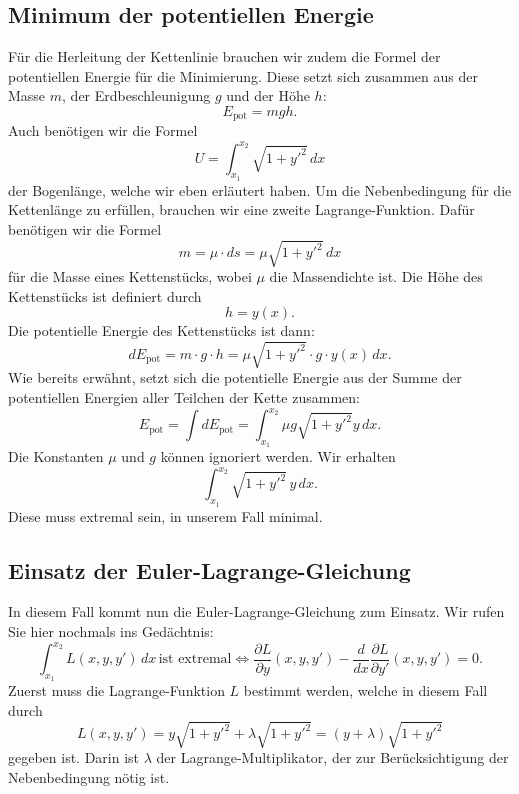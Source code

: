 \subsection{Minimum der potentiellen Energie
\label{kettenlinie:subsection:Minimum der potentiellen Energie}}
Für die Herleitung der Kettenlinie brauchen wir zudem die Formel der potentiellen Energie für die Minimierung. Diese setzt sich zusammen aus der Masse \(m\), der Erdbeschleunigung \(g\) und der Höhe \(h\):
\begin{equation}
	E_{\text{pot}}
	=
	mgh.
\end{equation}
Auch benötigen wir die Formel 
\begin{equation}
	U
	=
	\int_{x_1}^{x_2} \sqrt{1 + y'^2} \, dx
\end{equation}
der Bogenlänge, welche wir eben erläutert haben.
Um die Nebenbedingung für die Kettenlänge zu erfüllen, brauchen wir eine zweite Lagrange-Funktion.
Dafür benötigen wir die Formel
\begin{equation}
	m = \mu \cdot ds = \mu \sqrt{1 + y'^2} \, dx
\end{equation}
für die Masse eines Kettenstücks, wobei \(\mu\) die Massendichte ist.
Die Höhe des Kettenstücks ist definiert durch
\begin{equation}
	h = y(x).
\end{equation}
Die potentielle Energie des Kettenstücks ist dann:
\begin{equation}
	dE_{\text{pot}} = m \cdot g \cdot h = \mu \sqrt{1 + y'^2} \cdot g \cdot y(x) \, dx.
\end{equation}
Wie bereits erwähnt, setzt sich die potentielle Energie aus der Summe der potentiellen Energien aller Teilchen der Kette zusammen:
\begin{equation}
	E_{\text{pot}} = \int dE_{\text{pot}} = \int_{x_1}^{x_2} \mu g \sqrt{1 + y'^2} y  \, dx.
\end{equation}
Die Konstanten \(\mu\) und \(g\) können ignoriert werden.
Wir erhalten
\begin{equation}
	\int_{x_1}^{x_2} \sqrt{1 + y'^2} \, y \, dx.
\end{equation}
Diese muss extremal sein, in unserem Fall minimal.

\subsection{Einsatz der Euler-Lagrange-Gleichung
\label{kettenlinie:subsection:Einsatz der Euler-Lagrange-Gleichung}}
In diesem Fall kommt nun die Euler-Lagrange-Gleichung zum Einsatz.
Wir rufen Sie hier nochmals ins Gedächtnis:
\begin{equation}
	\int_{x_1}^{x_2} L(x, y, y') \, dx \, \text{ist extremal} \iff \frac{\partial L}{\partial y}(x, y, y') - \frac{d}{dx} \frac{\partial L}{\partial y'}(x, y, y') = 0.
\end{equation}
Zuerst muss die Lagrange-Funktion \(L\) bestimmt werden, welche in diesem Fall durch
\begin{equation}
	L(x, y, y')
	=
	y \sqrt{1+y'^2} + \lambda \sqrt{1+y'^2}
	=
	(y + \lambda) \sqrt{1+y'^2}
\end{equation}
gegeben ist.
Darin ist \(\lambda\) der Lagrange-Multiplikator, der zur Berücksichtigung der Nebenbedingung nötig ist.

